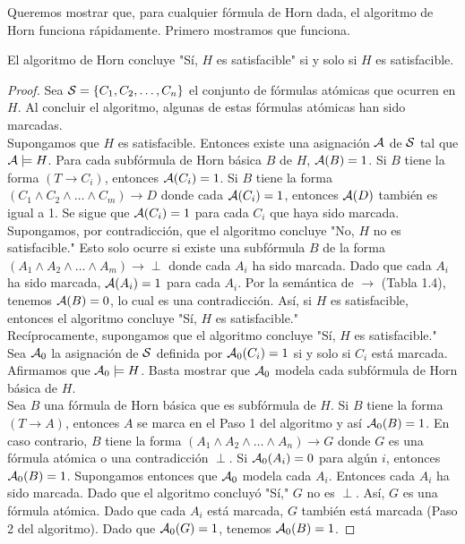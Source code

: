 \documentclass[12pt,a4paper]{book}
\newcommand{\comillas}[1]{"#1"}
\begin{document}
    Queremos mostrar que, para cualquier fórmula de Horn dada, el algoritmo de Horn funciona rápidamente. Primero mostramos
    que funciona.

    \begin{proposicion}\label{prop:algoritmo-horn-correcto}
        El algoritmo de Horn concluye \comillas{Sí, $H$ es satisfacible} si y solo si $H$ es satisfacible.
    \end{proposicion}
    \begin{proof}
        Sea $\SS=\{C_{1},C_{2},\dots,C_{n}\}$ el conjunto de fórmulas atómicas que ocurren en $H$. Al concluir el algoritmo,
        algunas de estas fórmulas atómicas han sido marcadas.\\
        Supongamos que $H$ es satisfacible. Entonces existe una asignación $\AA$ de $\SS$ tal que $\AA\models H$. Para cada
        subfórmula de Horn básica $B$ de $H$, $\AA(B)=1$. Si $B$ tiene la forma $(T\rightarrow C_{i})$, entonces
        $\AA(C_{i})=1$. Si $B$ tiene la forma $(C_{1}\wedge C_{2}\wedge\dots\wedge C_{m})\rightarrow D$ donde cada
        $\AA(C_{i})=1$, entonces $\AA(D)$ también es igual a 1. Se sigue que $\AA(C_{i})=1$ para cada $C_{i}$ que haya sido
        marcada.\\
        Supongamos, por contradicción, que el algoritmo concluye \comillas{No, $H$ no es satisfacible.} Esto solo ocurre si
        existe una subfórmula $B$ de la forma $(A_{1}\wedge A_{2}\wedge\dots\wedge A_{m})\rightarrow\perp$ donde cada
        $A_{i}$ ha sido marcada. Dado que cada $A_{i}$ ha sido marcada, $\AA(A_{i})=1$ para cada $A_{i}$. Por la semántica de
        $\rightarrow$ (Tabla 1.4), tenemos $\AA(B)=0$, lo cual es una contradicción. Así, si $H$ es satisfacible, entonces el
        algoritmo concluye \comillas{Sí, $H$ es satisfacible.}\\
        Recíprocamente, supongamos que el algoritmo concluye \comillas{Sí, $H$ es satisfacible.} Sea $\AA_{0}$ la asignación
        de $\SS$ definida por $\AA_{0}(C_{i})=1$ si y solo si $C_{i}$ está marcada. Afirmamos que $\AA_{0}\models H$. Basta
        mostrar que $\AA_{0}$ modela cada subfórmula de Horn básica de $H$.\\
        Sea $B$ una fórmula de Horn básica que es subfórmula de $H$. Si $B$ tiene la forma $(T\rightarrow A)$, entonces $A$
        se marca en el Paso 1 del algoritmo y así $\AA_{0}(B)=1$. En caso contrario, $B$ tiene la forma
        $(A_{1}\wedge A_{2}\wedge\dots\wedge A_{n})\rightarrow G$ donde $G$ es una fórmula atómica o una contradicción
        $\perp$. Si $\AA_{0}(A_{i})=0$ para algún $i$, entonces $\AA_{0}(B)=1$. Supongamos entonces que $\AA_{0}$ modela cada
        $A_{i}$. Entonces cada $A_{i}$ ha sido marcada. Dado que el algoritmo concluyó \comillas{Sí,} $G$ no es $\perp$. Así,
        $G$ es una fórmula atómica. Dado que cada $A_{i}$ está marcada, $G$ también está marcada (Paso 2 del algoritmo).
        Dado que $\AA_{0}(G)=1$, tenemos $\AA_{0}(B)=1$.
    \end{proof}
\end{document}
